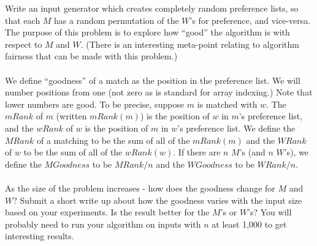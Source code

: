  Write an input generator which creates completely random preference lists, so that each $M$ has a random permutation of the $W$'s for preference, and vice-versa.   The purpose of this problem is to explore how ``good'' the algorithm is with respect to $M$ and $W$.  (There is an interesting meta-point relating to algorithm fairness that can be made with this problem.)
 \\
 \\
 We define ``goodness'' of a match as the position in the preference list.  We will number positions from one (not zero as is standard for array indexing.)   Note that lower numbers are good.   To be precise, suppose $m$ is matched with $w$.  The $mRank$ of $m$ (written $mRank(m)$) is the position of $w$ in $m$'s preference list,  and the $wRank$ of $w$ is the position of $m$ in $w$'s preference list.  We define the $MRank$ of a matching to be the sum of all of the $mRank(m)$ and the $WRank$ of $w$ to be the sum of all of the $wRank(w)$.   If there are $n$ $M$'s (and $n$ $W$'s),  we define the $MGoodness$ to be $MRank / n$ and the $WGoodness$ to be $WRank / n$.
 \\
 \\
 
As the size of the problem increases - how does the goodness change for $M$ and $W$?    Submit a short write up about how the goodness varies with the input size based on your experiments.   Is the result better for the $M$'s or $W$'s? You will probably need to run your algorithm on inputs with $n$ at least 1,000 to get interesting results.   



 













